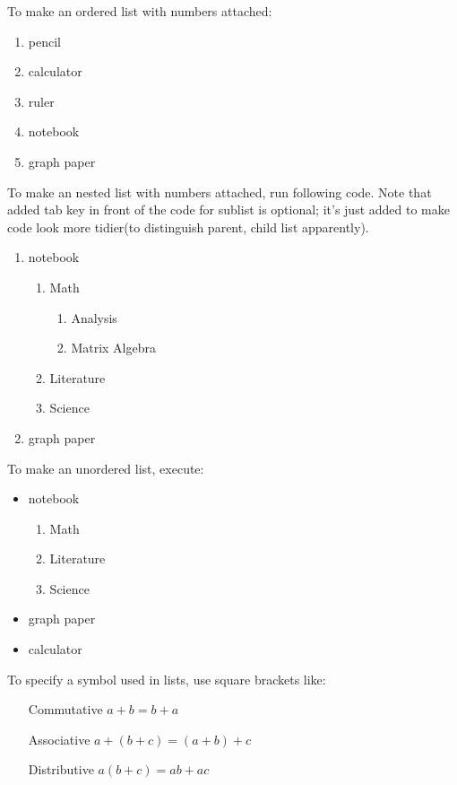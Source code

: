 \documentclass[11pt]{article}
\begin{document}
To make an ordered list with numbers attached:
\begin{enumerate}
\item pencil
\item calculator
\item ruler
\item notebook
\item graph paper
\end{enumerate}

To make an nested list with numbers attached, run following code. Note that added
tab key in front of the code for sublist is optional; it's just added to make code
look more tidier(to distinguish parent, child list apparently).
\begin{enumerate}
\item notebook
	\begin{enumerate}
	\item Math
		\begin{enumerate}
		\item Analysis
		\item Matrix Algebra
		\end{enumerate}
	\item Literature
	\item Science
	\end{enumerate}
\item graph paper
\end{enumerate}

To make an unordered list, execute:
\begin{itemize}
\item notebook
	\begin{enumerate}
	\item Math
	\item Literature
	\item Science
	\end{enumerate}
\item graph paper
\item calculator
\end{itemize}

To specify a symbol used in lists, use square brackets like:
\begin{enumerate}
\item[Commutative] $a+b=b+a$
\item[Associative] $a+(b+c)=(a+b)+c$
\item[Distributive] $a(b+c)=ab+ac$
\end{enumerate}
\end{document}

